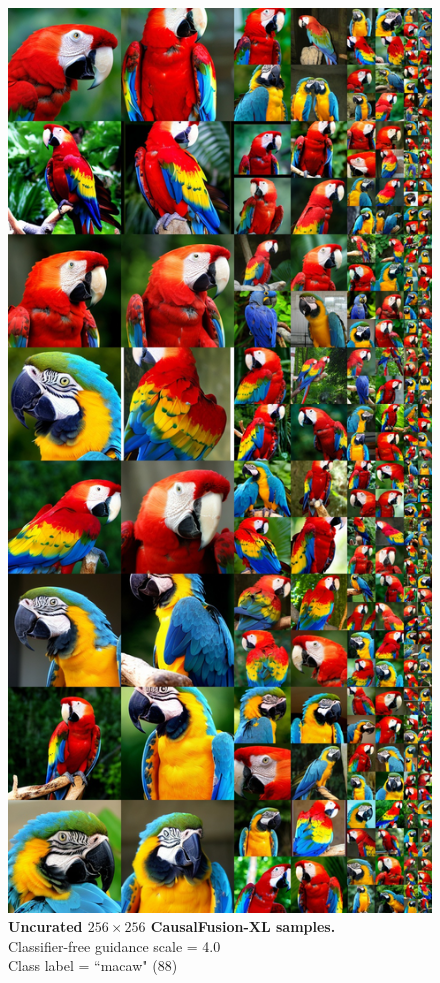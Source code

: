 \begin{figure}\centering
\includegraphics[width=\linewidth]{figs/xl256_88_cfg4.0.jpg}
\caption{\textbf{Uncurated $256\times256$ CausalFusion-XL samples.} \\Classifier-free guidance scale = 4.0\\Class label = ``macaw" (88)}\vspace{-2mm}
\label{fig:samples256_1}
\end{figure}

